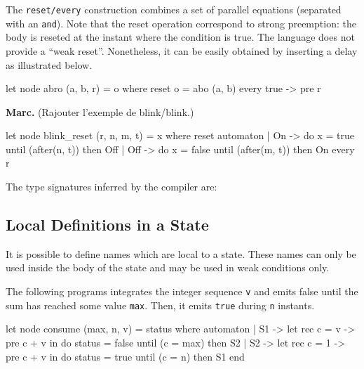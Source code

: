\documentclass[11pt,titlepage,twoside]{report}
\newcommand{\Marc}[1]{{\bf Marc.} ({#1})}
\begin{document}
The \verb-reset/every- construction combines a set of parallel
equations (separated with an \verb-and-). Note that the reset
operation correspond to strong preemption: the body is reseted at the
instant where the condition is true. The language does not provide a
``weak reset''. Nonetheless, it can be easily obtained by inserting a
delay as illustrated below.

\begin{runverbatim}
  let node abro (a, b, r) = o where
    reset
      o = abo (a, b)
    every true -> pre r
\end{runverbatim}



\Marc{Rajouter l'exemple de blink/blink.}

\begin{runverbatim}
let node blink_reset (r, n, m, t) = x where
 reset
   automaton
   | On  -> do x = true  until (after(n, t)) then Off
   | Off -> do x = false until (after(m, t)) then On
 every r
\end{runverbatim}

\medskip
The type signatures inferred by the compiler are:
\runverbatimmsg{}

\subsection{Local Definitions in a State}
It is possible to define names which are local to a state. These names
can only be used inside the body of the state and may be used in weak
conditions only.

The following programs integrates the integer sequence \verb-v- and
emits false until the sum has reached some value \verb-max-. Then, it
emits \verb-true- during \verb-n- instants.

\begin{runverbatim}
let node consume (max, n, v) = status where
  automaton
  | S1 ->
      let rec c = v -> pre c + v in
      do status = false
      until (c = max) then S2
  | S2 ->
      let rec c = 1 -> pre c + v in
      do status = true
      until (c = n) then S1
  end
\end{runverbatim}
\end{document}
